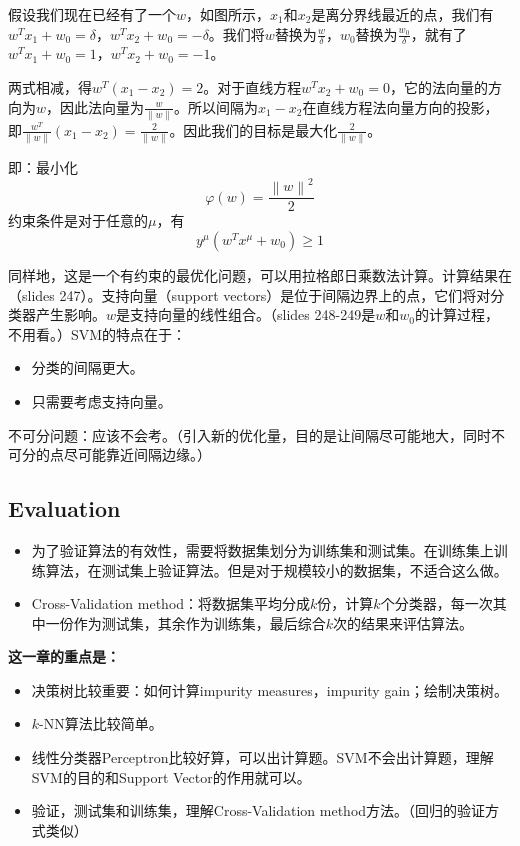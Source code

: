 \documentclass[12pt, a4paper, oneside]{ctexart}
\newenvironment{zd}{\begin{shaded}\par\noindent\textbf{这一章的重点是：}}{\end{shaded}\par}
\begin{document}
\begin{itemize}
    假设我们现在已经有了一个$w$，如图所示，$x_1$和$x_2$是离分界线最近的点，我们有$w^Tx_1+w_0=\delta$，$w^Tx_2+w_0=-\delta$。我们将$w$替换为$\frac{w}{\delta}$，$w_0$替换为$\frac{w_0}{\delta}$，就有了$w^Tx_1+w_0=1$，$w^Tx_2+w_0=-1$。

    两式相减，得$w^T(x_1-x_2)=2$。对于直线方程$w^Tx_2+w_0=0$，它的法向量的方向为$w$，因此法向量为$\frac{w}{\left\|w\right\|}$。所以间隔为$x_1-x_2$在直线方程法向量方向的投影，即$\frac{w^T}{\left\|w\right\|}(x_1-x_2)=\frac{2}{\left\|w\right\|}$。因此我们的目标是最大化$\frac{2}{\left\|w\right\|}$。
    
    即：最小化$$\varphi (w)=\frac{{\left\|w\right\|}^2}{2}$$约束条件是对于任意的$\mu$，有$$y^\mu(w^Tx^\mu+w_0)\geqslant 1$$

    同样地，这是一个有约束的最优化问题，可以用拉格郎日乘数法计算。计算结果在（slides 247）。支持向量（support vectors）是位于间隔边界上的点，它们将对分类器产生影响。$w$是支持向量的线性组合。（slides 248-249是$w$和$w_0$的计算过程，不用看。）SVM的特点在于：
    \begin{itemize}
        \item 分类的间隔更大。
        \item 只需要考虑支持向量。
    \end{itemize}

    不可分问题：应该不会考。（引入新的优化量，目的是让间隔尽可能地大，同时不可分的点尽可能靠近间隔边缘。）
\end{itemize} 
\subsection{Evaluation}
\begin{itemize}
    \item 为了验证算法的有效性，需要将数据集划分为训练集和测试集。在训练集上训练算法，在测试集上验证算法。但是对于规模较小的数据集，不适合这么做。
    \item Cross-Validation method：将数据集平均分成$k$份，计算$k$个分类器，每一次其中一份作为测试集，其余作为训练集，最后综合$k$次的结果来评估算法。
\end{itemize}
\begin{zd}
    \begin{itemize}
        \item 决策树比较重要：如何计算impurity measures，impurity gain；绘制决策树。
        \item $k$-NN算法比较简单。
        \item 线性分类器Perceptron比较好算，可以出计算题。SVM不会出计算题，理解SVM的目的和Support Vector的作用就可以。
        \item 验证，测试集和训练集，理解Cross-Validation method方法。（回归的验证方式类似）
    \end{itemize}
\end{zd}
\end{document}
